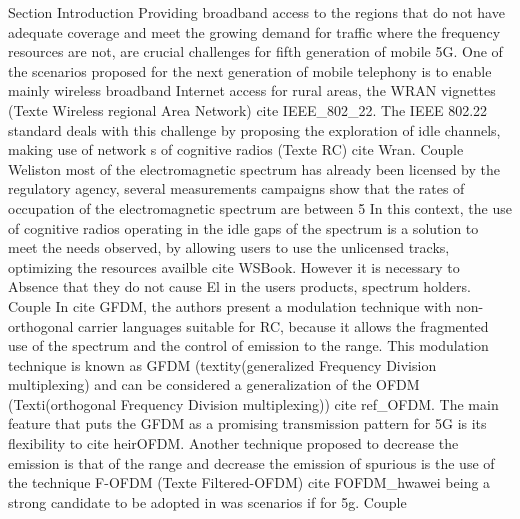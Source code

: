 Section {Introduction}
Providing broadband access to the regions that do not have adequate coverage and meet the growing demand for traffic where the frequency resources are not, are crucial challenges for fifth generation of mobile 5G. One of the scenarios proposed for the next generation of mobile telephony is to enable mainly wireless broadband Internet access for rural areas, the WRAN vignettes (Texte {Wireless regional Area Network}) cite {IEEE_802_22}. The IEEE 802.22 standard deals with this challenge by proposing the exploration of idle channels, making use of network s of cognitive radios (Texte {RC}) cite {Wran}. Couple
Weliston most of the electromagnetic spectrum has already been licensed by the regulatory agency, several measurements campaigns show that the rates of occupation of the electromagnetic spectrum are between 5%
In this context, the use of cognitive radios operating in the idle gaps of the spectrum is a solution to meet the needs observed, by allowing users to use the unlicensed tracks, optimizing the resources availble cite { WSBook}. However it is necessary to Absence that they do not cause El in the users products, spectrum holders. Couple
In cite {GFDM}, the authors present a modulation technique with non-orthogonal carrier languages suitable for RC, because it allows the fragmented use of the spectrum and the control of emission to the range. This modulation technique is known as GFDM (textity(generalized Frequency Division multiplexing) and can be considered a generalization of the OFDM (Texti(orthogonal Frequency Division multiplexing)) cite {ref_OFDM}. The main feature that puts the GFDM as a promising transmission pattern for 5G is its flexibility to cite {heirOFDM}. Another technique proposed to decrease the emission is that of the range and decrease the emission of spurious is the use of the technique F-OFDM (Texte {Filtered-OFDM}) cite {FOFDM_hwawei} being a strong candidate to be adopted in was scenarios if for 5g. Couple
